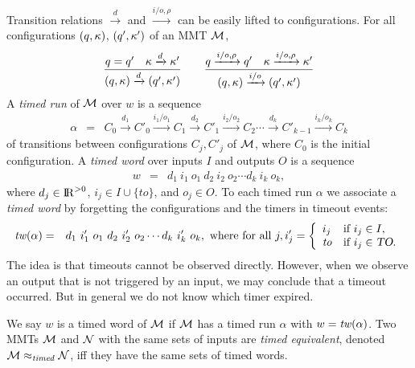 Transition relations $\xrightarrow{d}$ and $\xrightarrow{i/o, \rho}$ can be easily lifted to configurations.
For all configurations $(q, \kappa)$, $(q', \kappa')$ of an MMT ${\cal M}$,
\[
\frac{q = q' \quad \kappa \xrightarrow{d} \kappa'}{(q,\kappa) \xrightarrow{d} (q',\kappa')}
\quad\quad
  \frac{q \xrightarrow{i/o,\rho} q' \quad \kappa \xrightarrow{i/o, \rho} \kappa'}{(q,\kappa) \xrightarrow{i/o} (q',\kappa')}
\]
A \emph{timed run} of ${\cal M}$ over $w$ is a sequence 
\begin{eqnarray*}
\alpha & = & C_0 \xrightarrow{d_1} C'_0 \xrightarrow{i_1/o_1} C_1 \xrightarrow{d_2} C'_1 \xrightarrow{i_2/o_2} C_2 \cdots
\xrightarrow{d_k} C'_{k-1} \xrightarrow{i_k/o_k} C_{k}
\end{eqnarray*}
of transitions between configurations $C_j, C'_j$ of ${\cal M}$, where $C_0$ is the initial configuration.
A \emph{timed word} over inputs $I$ and outputs $O$ is a sequence
\begin{eqnarray*}
w & = &  d_1 ~ i_1 ~ o_1 ~ d_2 ~ i_2 ~ o_2 \cdots d_k ~ i_k ~ o_k,
\end{eqnarray*}
where $d_j \in {\rm I\!R}^{> 0}$, $i_j \in I \cup \{ \mathit{to} \}$, and $o_j \in O$.
To each timed run $\alpha$ we associate a \emph{timed word} by forgetting the configurations and the timers
in timeout events:
\begin{eqnarray*}
\mathit{tw}(\alpha) & = & d_1 ~ i'_1 ~ o_1 ~ d_2 ~ i'_2 ~ o_2 \cdots d_k ~ i'_k ~ o_k, \mbox{ where for all } j,
i'_j  =  \left\{ \begin{array}{ll}
i_j & \mbox{if } i_j \in I,\\
\mathit{to} & \mbox{if } i_j \in \mbox{\sl TO}.
\end{array} \right.
\end{eqnarray*}
The idea is that timeouts cannot be observed directly. 
However, when we observe an output that is not triggered by an input, we may
conclude that a timeout occurred. But in general we do not know which timer expired.

We say $w$ is a timed word of ${\cal M}$ if ${\cal M}$ has a timed run $\alpha$ with $w = \mathit{tw}(\alpha)$.
%
Two MMTs ${\cal M}$ and ${\cal N}$ with the same sets of inputs are \emph{timed equivalent}, denoted ${\cal M} \approx_{\mathit{timed}} {\cal N}$, iff 
they have the same sets of timed words.

